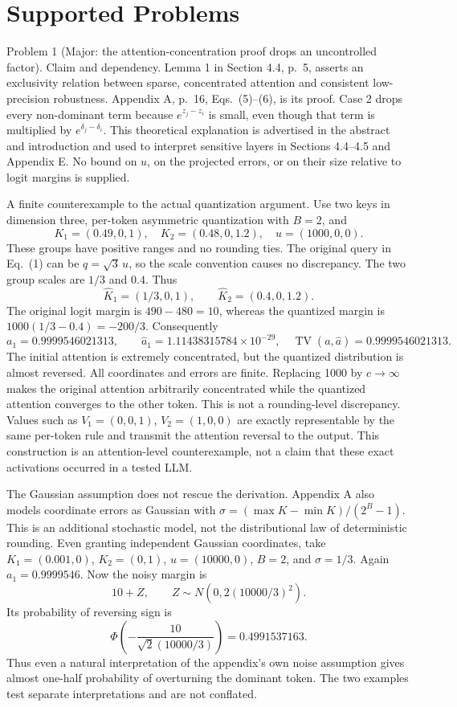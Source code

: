 \documentclass[10pt]{article}
\begin{document}
\section*{Supported Problems}
Problem 1 (Major: the attention-concentration proof drops an uncontrolled factor).  Claim and dependency. Lemma 1 in Section 4.4, p. 5, asserts an exclusivity relation between sparse, concentrated attention and consistent low-precision robustness. Appendix A, p. 16, Eqs. (5)–(6), is its proof. Case 2 drops every non-dominant term because \(e^{z_j-z_i}\) is small, even though that term is multiplied by \(e^{\delta_j-\delta_i}\). This theoretical explanation is advertised in the abstract and introduction and used to interpret sensitive layers in Sections 4.4–4.5 and Appendix E. No bound on \(u\), on the projected errors, or on their size relative to logit margins is supplied.\par
A finite counterexample to the actual quantization argument. Use two keys in dimension three, per-token asymmetric quantization with \(B=2\), and \[K_1=(0.49,0,1),\quad K_2=(0.48,0,1.2),\quad u=(1000,0,0).\] These groups have positive ranges and no rounding ties. The original query in Eq. (1) can be \(q=\sqrt3\,u\), so the scale convention causes no discrepancy. The two group scales are \(1/3\) and \(0.4\). Thus \[\widehat K_1=(1/3,0,1),\qquad \widehat K_2=(0.4,0,1.2).\] The original logit margin is \(490-480=10\), whereas the quantized margin is \(1000(1/3-0.4)=-200/3\). Consequently \[a_1=0.9999546021313,\qquad
 \widehat a_1=1.11438315784\times10^{-29},
 \quad \operatorname{TV}(a,\widehat a)=0.9999546021313.\] The initial attention is extremely concentrated, but the quantized distribution is almost reversed. All coordinates and errors are finite. Replacing 1000 by \(c\to\infty\) makes the original attention arbitrarily concentrated while the quantized attention converges to the other token. This is not a rounding-level discrepancy. Values such as \(V_1=(0,0,1)\), \(V_2=(1,0,0)\) are exactly representable by the same per-token rule and transmit the attention reversal to the output. This construction is an attention-level counterexample, not a claim that these exact activations occurred in a tested LLM.\par
The Gaussian assumption does not rescue the derivation. Appendix A also models coordinate errors as Gaussian with \(\sigma=(\max K-\min K)/(2^B-1)\). This is an additional stochastic model, not the distributional law of deterministic rounding. Even granting independent Gaussian coordinates, take \(K_1=(0.001,0)\), \(K_2=(0,1)\), \(u=(10000,0)\), \(B=2\), and \(\sigma=1/3\). Again \(a_1=0.9999546\). Now the noisy margin is \[10+Z,\qquad Z\sim N(0,2(10000/3)^2).\] Its probability of reversing sign is \[\Phi\!\left(-\frac{10}{\sqrt2(10000/3)}\right)=0.4991537163.\] Thus even a natural interpretation of the appendix’s own noise assumption gives almost one-half probability of overturning the dominant token. The two examples test separate interpretations and are not conflated.\par
\end{document}
